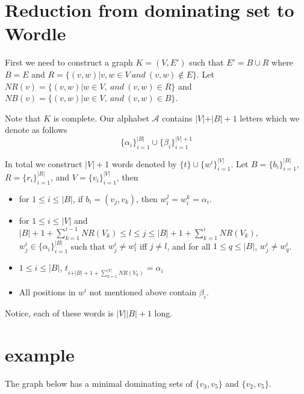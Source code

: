 \documentclass[10pt,a4paper]{article}
\begin{document}
\section{Reduction from dominating set to Wordle}
First we need to construct a graph $K = (V,E')$ such that $E' =B\cup R$ where $B=E$ and $R =\{ (v,w)\vert v,w\in V \ and \ (v,w)\not \in E\}$. Let $\mathit{NR}(v) =\{ (v,w)\vert w\in V,\ and \ (v,w)\in R\}$ and
$\mathit{NB}(v) =\{ (v,w)\vert w\in V,\ and \ (v,w)\in B\}$.


Note that $K$ is complete. Our alphabet $\mathcal{A}$ contains 
$\vert V\vert+\vert B\vert+1$ letters which we denote as follows
$$\{\alpha_{i}\}^{\vert B\vert}_{i=1}\cup \{\beta_{i}\}^{\vert V\vert+1}_{i=1}$$

In total we construct $\vert V\vert+1$ words denoted by $\{ t\}\cup \{w^{i}\}^{\vert V\vert}_{i=1}$. Let $ B  = \{b_{i}\}^{\vert B\vert}
_{i=1}$, $ R  = \{r_{i}\}^{\vert R\vert}
_{i=1}$, and  $ V  = \{v_{i}\}^{\vert V\vert}_{i=1}$, then 
\begin{itemize}

\item for $1\leq i \leq \vert B\vert$, if $b_i = (v_j,v_k)$, then $w^j_i=w^k_i=\alpha_i$.

\item for $1\leq i \leq \vert V\vert$ and $\vert B\vert +1+\sum_{k=1}^{i-1} \mathit{NR}(V_{k})\leq l\leq j \leq \vert B\vert +1+\sum_{k=1}^{i} \mathit{NR}(V_{k}),$ $w^i_j \in \{\alpha_{i}\}^{\vert B\vert}_{i=1}$ such that $w^i_j \not = w^i_l$ iff $j\not = l$, and for all $1\leq q \leq \vert B\vert$, $w^i_j\not = w^i_q$. 
\item $1\leq i \leq \vert B\vert$, $t_{i+\vert B\vert +1+\sum_{k=1}^{\vert V\vert} \mathit{NR}(V_{k})} = \alpha_i$
\item All positions in $w^i$ not mentioned above contain $\beta_i$.
\end{itemize}

Notice, each of these words is $\vert V\vert \vert B\vert+1$ long. 
\section{example}

The graph below has a minimal dominating sets of $\{ v_3,v_5\}$ and $\{ v_2,v_5\}$.
\begin{center}
\end{center}
\end{document}
